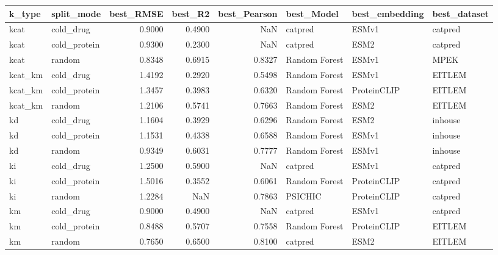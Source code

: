 \begin{tabular}{llrrrlll}
\toprule
k_type & split_mode & best_RMSE & best_R2 & best_Pearson & best_Model & best_embedding & best_dataset \\
\midrule
kcat & cold_drug & 0.9000 & 0.4900 & NaN & catpred & ESMv1 & catpred \\
kcat & cold_protein & 0.9300 & 0.2300 & NaN & catpred & ESM2 & catpred \\
kcat & random & 0.8348 & 0.6915 & 0.8327 & Random Forest & ESMv1 & MPEK \\
kcat_km & cold_drug & 1.4192 & 0.2920 & 0.5498 & Random Forest & ESMv1 & EITLEM \\
kcat_km & cold_protein & 1.3457 & 0.3983 & 0.6320 & Random Forest & ProteinCLIP & EITLEM \\
kcat_km & random & 1.2106 & 0.5741 & 0.7663 & Random Forest & ESM2 & EITLEM \\
kd & cold_drug & 1.1604 & 0.3929 & 0.6296 & Random Forest & ESM2 & inhouse \\
kd & cold_protein & 1.1531 & 0.4338 & 0.6588 & Random Forest & ESMv1 & inhouse \\
kd & random & 0.9349 & 0.6031 & 0.7777 & Random Forest & ESMv1 & inhouse \\
ki & cold_drug & 1.2500 & 0.5900 & NaN & catpred & ESMv1 & catpred \\
ki & cold_protein & 1.5016 & 0.3552 & 0.6061 & Random Forest & ProteinCLIP & catpred \\
ki & random & 1.2284 & NaN & 0.7863 & PSICHIC & ProteinCLIP & catpred \\
km & cold_drug & 0.9000 & 0.4900 & NaN & catpred & ESMv1 & catpred \\
km & cold_protein & 0.8488 & 0.5707 & 0.7558 & Random Forest & ProteinCLIP & EITLEM \\
km & random & 0.7650 & 0.6500 & 0.8100 & catpred & ESM2 & EITLEM \\
\bottomrule
\end{tabular}
